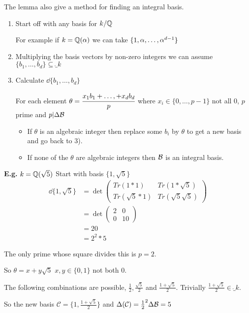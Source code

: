 \documentclass[11pt]{article}
\begin{document}
\spa
The lemma also give a method for finding an integral basis.

\begin{enumerate}
	\item{Start off with any basis for $k/\mathbb{Q}$}
	
		For example if  $k = \mathbb{Q}(\alpha)$ we can take $\{1, \alpha, \dots, \alpha^{d-1} \}$
	\item{Multiplying the basis vectors by non-zero integers we can assume $\{ b_1, \dots, b_d\} \subseteq \ring_k$}
	\item{Calculate $\dd \{ b_1, \dots, b_d\}$}

		For each element $\theta = \cfrac{x_1b_1+\dots, + x_db_d}{p}$ \hspace{7pt}where $x_i \in \{0,\dots, p-1\}$ not all 0, $p$ prime and $p | \Delta \mathcal{B} $
		\begin{itemize}
			\item{If $\theta$ is an algebraic integer then replace some $b_i$ by $\theta$ to get a new basis and go back to 3).}
			\item{If none of the $\theta$ are algebraic integers then $\mathcal{B}$ is an integral basis.}
		\end{itemize}
\end{enumerate}
\textbf{E.g.} $ k = \mathbb{Q}(\sqrt{5})$ Start with basis $\{1, \sqrt5\}$
\begin{align*}
	\dd\{1, \sqrt5\} & = \det \begin{pmatrix}
		Tr(1*1) & Tr(1*\sqrt5)\\
		Tr(\sqrt5*1) & Tr(\sqrt5\sqrt5)
	\end{pmatrix}\\
	&= \det \begin{pmatrix}
		2 & 0 \\
		0 & 10
	\end{pmatrix}\\ 
	&= 20 \\
	&=2^2 *5
\end{align*}

The only prime whose square divides this is $p=2$.
\spa

So $\theta = x+y\sqrt5 $\hspace{7pt} $x,y \in \{0,1\}$ not both 0.
\spa

The following combinations are possible, $\frac{1}{2}, \frac{\sqrt5}2$ and $\frac{1+\sqrt5}2$. Trivially $\frac{1+\sqrt5}2 \in \ring_k$. 
\spa

So the new basis $\mathcal{C} = \{1, \frac{1+\sqrt5}2\}$ and $\Delta(\mathcal{C}) = \frac12^2 \Delta \mathcal{B} = 5$ 
\spa
\end{document}
